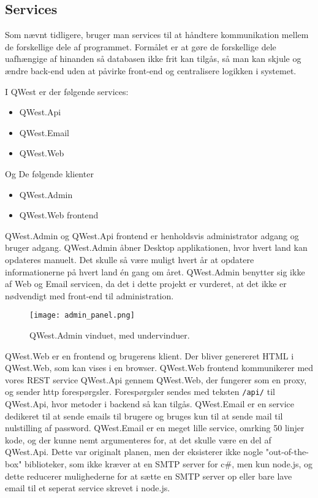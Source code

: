 \subsection{Services}\label{sec:servicesArc}
Som nævnt tidligere, bruger man services til at håndtere kommunikation mellem de forskellige dele af programmet. Formålet er at gøre de forskellige dele uafhængige af hinanden så databasen ikke frit kan tilgås, så man kan skjule og ændre back-end uden at påvirke front-end  og centralisere logikken i systemet. 

I QWest er der følgende services:
\begin{itemize}\label{services}
    \item QWest.Api
    \item QWest.Email
    \item QWest.Web
\end{itemize}

Og De følgende klienter
\begin{itemize}\label{services}
    \item QWest.Admin
    \item QWest.Web frontend
\end{itemize}

QWest.Admin og QWest.Api frontend er henholdsvis administrator adgang og bruger adgang. QWest.Admin åbner Desktop applikationen, hvor hvert land kan opdateres manuelt. Det skulle så være muligt hvert år at opdatere informationerne på hvert land én gang om året. QWest.Admin benytter sig ikke af Web og Email servicen, da det i dette projekt er vurderet, at det ikke er nødvendigt med front-end til administration. 

\begin{figure}
    \texttt{[image: admin\_panel.png]}
    \caption{QWest.Admin vinduet, med undervinduer.}
    \label{fig:admin_panel}
\end{figure}

QWest.Web er en frontend og brugerens klient. Der bliver genereret HTML i QWest.Web, som kan vises i en browser. QWest.Web frontend kommunikerer med vores REST service QWest.Api gennem QWest.Web, der fungerer som en proxy, og sender http forespørgsler. Forespørgsler sendes med teksten \texttt{/api/} til QWest.Api, hvor metoder i backend så kan tilgås. QWest.Email er en service dedikeret til at sende emails til brugere og bruges kun til at sende mail til nulstilling af password. QWest.Email er en meget lille service, omrking 50 linjer kode, og der kunne nemt argumenteres for, at det skulle være en del af QWest.Api. Dette var originalt planen, men der eksisterer ikke nogle "out-of-the-box" biblioteker, som ikke kræver at en SMTP server for c\#, men kun node.js, og dette reducerer mulighederne for at sætte en SMTP server op eller bare lave email til et seperat service skrevet i node.js.


